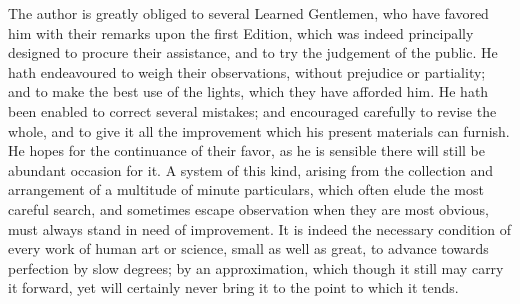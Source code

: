 The author is greatly obliged to several Learned Gentlemen, who have
favored him with their remarks upon the first Edition, which was indeed
principally designed to procure their assistance, and to try the
judgement of the public. He hath endeavoured to weigh their
observations, without prejudice or partiality; and to make the best use
of the lights, which they have afforded him. He hath been enabled to
correct several mistakes; and encouraged carefully to revise the whole,
and to give it all the improvement which his present materials can
furnish. He hopes for the continuance of their favor, as he is sensible
there will still be abundant occasion for it. A system of this kind,
arising from the collection and arrangement of a multitude of minute
particulars, which often elude the most careful search, and sometimes
escape observation when they are most obvious, must always stand in need
of improvement. It is indeed the necessary condition of every work of
human art or science, small as well as great, to advance towards
perfection by slow degrees; by an approximation, which though it still
may carry it forward, yet will certainly never bring it to the point to
which it tends.
